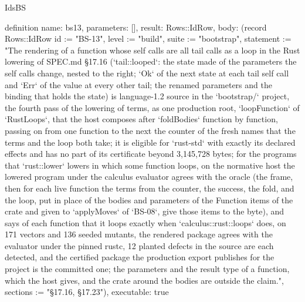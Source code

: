 \begin{lexlean}{IdsBS}
\begin{semanticmodule}
definition{
  name: bs13,
  parameters: [],
  result: Rows::IdRow,
  body: (record Rows::IdRow {id := "BS-13", level := "build", suite := "bootstrap", statement := "The rendering of a function whose self calls are all tail calls as a loop in the Rust lowering of SPEC.md §17.16 (`tail::looped`: the state made of the parameters the self calls change, nested to the right; `Ok` of the next state at each tail self call and `Err` of the value at every other tail; the renamed parameters and the binding that holds the state) is language-1.2 source in the `bootstrap/` project, the fourth pass of the lowering of terms, as one production root, `loopFunction` of `RustLoops`, that the host composes after `foldBodies` function by function, passing on from one function to the next the counter of the fresh names that the terms and the loop both take; it is eligible for `rust-std` with exactly its declared effects and has no part of its certificate beyond 3,145,728 bytes; for the programs that `rust::lower` lowers in which some function loops, on the normative host the lowered program under the calculus evaluator agrees with the oracle (the frame, then for each live function the terms from the counter, the success, the fold, and the loop, put in place of the bodies and parameters of the Function items of the crate and given to `applyMoves` of `BS-08`, give those items to the byte), and says of each function that it loops exactly when `calculus::rust::loops` does, on 171 vectors and 136 seeded mutants, the rendered package agrees with the evaluator under the pinned rustc, 12 planted defects in the source are each detected, and the certified package the production export publishes for the project is the committed one; the parameters and the result type of a function, which the host gives, and the crate around the bodies are outside the claim.", sections := "§17.16, §17.23"}),
  executable: true
}


\end{semanticmodule}
\end{lexlean}
